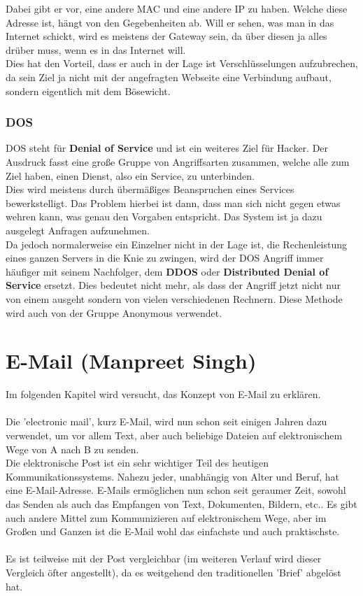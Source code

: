 \documentclass[12pt,a4paper]{report}
\begin{document}
\begin{onehalfspace}
Dabei gibt er vor, eine andere MAC und eine andere IP zu haben. Welche diese Adresse ist, hängt von den Gegebenheiten ab. Will er sehen, was man in das Internet schickt, wird es meistens der Gateway sein, da über diesen ja alles drüber muss, wenn es in das Internet will.\\
Dies hat den Vorteil, dass er auch in der Lage ist Verschlüsselungen aufzubrechen, da sein Ziel ja nicht mit der angefragten Webseite eine Verbindung aufbaut, sondern eigentlich mit dem Bösewicht. 

\subsection{DOS}
DOS steht für \textbf{Denial of Service} und ist ein weiteres Ziel für Hacker. Der Ausdruck fasst eine große Gruppe von Angriffsarten zusammen, welche alle zum Ziel haben, einen Dienst, also ein Service, zu unterbinden.\\
Dies wird meistens durch übermäßiges Beanspruchen eines Services bewerkstelligt. Das Problem hierbei ist dann, dass man sich nicht gegen etwas wehren kann, was genau den Vorgaben entspricht. Das System ist ja dazu ausgelegt Anfragen aufzunehmen.\\

Da jedoch normalerweise ein Einzelner nicht in der Lage ist, die Rechenleistung eines ganzen Servers in die Knie zu zwingen, wird der DOS Angriff immer häufiger mit seinem Nachfolger, dem \textbf{DDOS} oder \textbf{Distributed Denial of Service} ersetzt. Dies bedeutet nicht mehr, als dass der Angriff jetzt nicht nur von einem ausgeht sondern von vielen verschiedenen Rechnern. Diese Methode wird auch von der Gruppe Anonymous verwendet.

\chapter{E-Mail (Manpreet Singh)}
Im folgenden Kapitel wird versucht, das Konzept von E-Mail zu erklären.\\\\
Die 'electronic mail', kurz E-Mail, wird nun schon seit einigen Jahren dazu verwendet, um vor allem Text, aber auch beliebige Dateien auf elektronischem Wege von A nach B zu senden. \\
Die elektronische Post ist ein sehr wichtiger Teil des heutigen Kommunikationssystems. Nahezu jeder, unabhängig von Alter und Beruf, hat eine E-Mail-Adresse. E-Mails ermöglichen nun schon seit geraumer Zeit, sowohl das Senden als auch das Empfangen von Text, Dokumenten, Bildern, etc.. Es gibt auch andere Mittel zum Kommunizieren auf elektronischem Wege, aber im Großen und Ganzen ist die E-Mail wohl das einfachste und auch praktischste.\\\\
Es ist teilweise mit der Post vergleichbar (im weiteren Verlauf wird dieser Vergleich öfter angestellt), da es weitgehend den traditionellen 'Brief' abgelöst hat.  

\end{onehalfspace}
\end{document}
